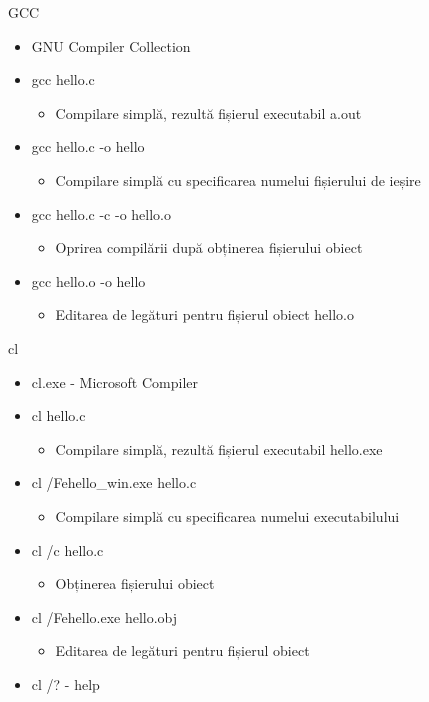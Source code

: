 \documentclass{so.cs.pub.ro}
\begin{document}
\begin{frame}{GCC}
	\begin{itemize}
		\item GNU Compiler Collection
		\item gcc hello.c
		\begin{itemize}
			\item Compilare simplă, rezultă fișierul executabil a.out
		\end{itemize}
		\item gcc hello.c -o hello
		\begin{itemize}
			\item Compilare simplă cu specificarea numelui fișierului de ieșire
		\end{itemize}
		\item gcc hello.c -c -o hello.o
		\begin{itemize}
			\item Oprirea compilării după obținerea fișierului obiect
		\end{itemize}
		\item gcc hello.o -o hello
		\begin{itemize}
			\item Editarea de legături pentru fișierul obiect hello.o
		\end{itemize}
	\end{itemize}
\end{frame}

\begin{frame}{cl}
	\begin{itemize}
		\item cl.exe - Microsoft Compiler
		\item cl hello.c
		\begin{itemize}
			\item Compilare simplă, rezultă fișierul executabil hello.exe
		\end{itemize}
		\item cl /Fehello\_win.exe hello.c
		\begin{itemize}
			\item Compilare simplă cu specificarea numelui executabilului
		\end{itemize}
		\item cl /c hello.c
		\begin{itemize}
			\item Obținerea fișierului obiect
		\end{itemize}
		\item cl /Fehello.exe hello.obj
		\begin{itemize}
			\item Editarea de legături pentru fișierul obiect
		\end{itemize}
		\item cl /? - help
	\end{itemize}
\end{frame}
\end{document}
